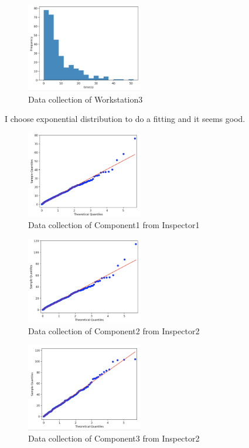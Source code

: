 \documentclass{article}
\begin{document}
\begin{figure}[htbp]
\begin{center}
\includegraphics[width=2in]{dataCollection6.png}
\caption{Data collection of Workstation3}
\label{data1}
\end{center}
\end{figure}

I choose exponential distribution to do a fitting and it seems good.

\begin{figure}[htbp]
\begin{center}
\includegraphics[width=2in]{hist1.png}
\caption{Data collection of Component1 from Inspector1}
\label{data1}
\end{center}
\end{figure}

\begin{figure}[htbp]
\begin{center}
\includegraphics[width=2in]{hist2.png}
\caption{Data collection of Component2 from Inspector2}
\label{data2}
\end{center}
\end{figure}

\begin{figure}[htbp]
\begin{center}
\includegraphics[width=2in]{hist3.png}
\caption{Data collection of Component3 from Inspector2}
\label{data3}
\end{center}
\end{figure}
\end{document}
